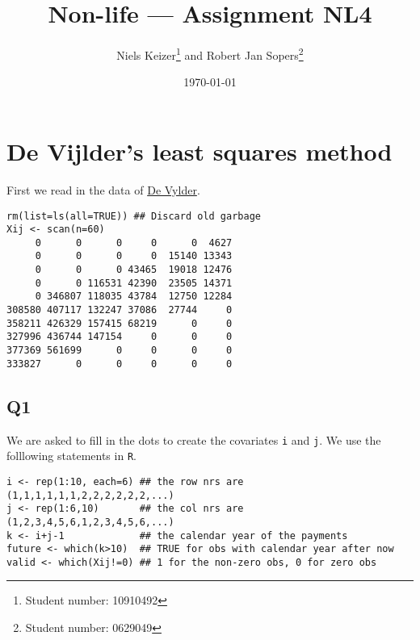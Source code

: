 \documentclass[11pt]{article}
\title{Non-life --- Assignment NL4}  %
\author{
  Niels Keizer\footnote{Student number: 10910492}
  \quad and \quad
  Robert Jan Sopers\footnote{Student number: 0629049}
}
\date{\today}
\begin{document}
\maketitle

\section{De Vijlder's least squares method}


First we read in the data of \href{http://www1.fee.uva.nl/ke/act/people/kaas/DeVylder78.pdf}{De Vylder}.

\begin{verbatim}
rm(list=ls(all=TRUE)) ## Discard old garbage
Xij <- scan(n=60)
     0      0      0     0      0  4627
     0      0      0     0  15140 13343
     0      0      0 43465  19018 12476
     0      0 116531 42390  23505 14371
     0 346807 118035 43784  12750 12284
308580 407117 132247 37086  27744     0
358211 426329 157415 68219      0     0
327996 436744 147154     0      0     0
377369 561699      0     0      0     0
333827      0      0     0      0     0
\end{verbatim}

\subsection*{Q1}

We are asked to fill in the dots to create the covariates \verb|i| and \verb|j|. We use the folllowing statements in \verb|R|.

\begin{verbatim}
i <- rep(1:10, each=6) ## the row nrs are (1,1,1,1,1,1,2,2,2,2,2,2,...)
j <- rep(1:6,10)       ## the col nrs are (1,2,3,4,5,6,1,2,3,4,5,6,...)
k <- i+j-1             ## the calendar year of the payments
future <- which(k>10)  ## TRUE for obs with calendar year after now
valid <- which(Xij!=0) ## 1 for the non-zero obs, 0 for zero obs
\end{verbatim}
\end{document}

